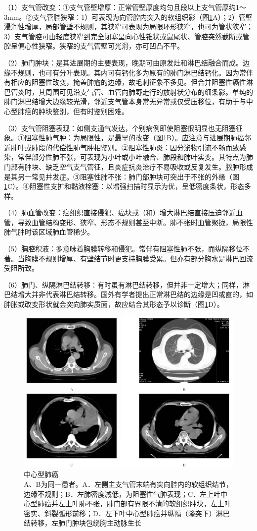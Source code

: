 （1）支气管改变：①支气管壁增厚：正常管壁厚度均匀且段以上支气管厚约1～3mm。②支气管腔狭窄：1）可表现为向管腔内突入的软组织影（图\ref{fig9-28}A）；2）管壁浸润性增厚，局部管壁不规则，其狭窄可表现为局限环形狭窄，也可为管状狭窄；3）支气管腔可由轻度狭窄到完全闭塞呈向心性锥状或鼠尾状、管腔突然截断或管腔呈偏心性狭窄。狭窄的支气管壁可光滑，亦可凹凸不平。

（2）肺门肿块：是其进展期的主要表现，晚期可由原发灶和淋巴结融合而成。边缘不规则，也可有分叶表现。其内可有钙化多为原有的肺门淋巴结钙化。因为常伴有相应的阻塞性改变，掩盖肿瘤的边缘，故毛刺征象不多见。但合并阻塞性癌性淋巴管炎时，其周围可见沿支气管、血管向肺野走行的放射状分布的细条影。单纯的肺门淋巴结增大边缘较光滑，邻近支气管本身常无异常或仅受压移位，有助于与中心型肺癌的肿块鉴别，但有时鉴别困难。

（3）支气管阻塞表现：如侧支通气发达，个别病例即使阻塞很明显也无阻塞征象。①阻塞性肺气肿：为局限性，是最早的改变（图\ref{fig9-28}B）。应注意与进展期肺癌邻近肺叶或肺段的代偿性肺气肿相鉴别。②阻塞性肺炎：因分泌物引流不畅而致感染，常伴部分性肺不张，可表现为小叶或小叶融合、肺段和肺叶实变。其特点为肺门部有肿块、缺乏空气支气管征，且炎症抗炎治疗不易吸收或反复发生。脓肿形成是其另一常见并发症。③阻塞性肺不张：肺门部肿块可突出于不张的外缘（图\ref{fig9-28}C）。④阻塞性支扩和黏液栓塞：以增强扫描时显示为优，呈低密度条状，形态多样。

（4）肺血管改变：癌组织直接侵犯、癌块或（和）增大淋巴结直接压迫邻近血管，导致血管结构变形、狭窄、形态不规则甚至中断。肺不张时血管聚拢，局限性肺气肿时该区域肺血管稀少。

（5）胸腔积液：多意味着胸膜转移和侵犯。常伴有阻塞性肺不张，而纵隔移位不著。当胸膜不规则增厚、有壁结节时更支持胸膜受累。但亦有部分胸水是淋巴回流受阻所致。

（6）肺门、纵隔淋巴结转移：有时虽有淋巴结转移，但并非一定增大；同样，淋巴结增大并非代表淋巴结转移。国外有学者提出正常淋巴结的边缘是凹或直的，如肿胀或改变形状就会突向肺实质面，故应结合其形态予以诊断（图\ref{fig9-28}D）。

\begin{figure}[!htbp]
 \centering
 \includegraphics[width=.7\textwidth,height=\textheight,keepaspectratio]{./images/Image00216.jpg}
 \captionsetup{justification=centering}
 \caption{中心型肺癌\\{\small A、B为同一患者。A．左侧主支气管末端有突向腔内的软组织结节，边缘不规则；B．左肺密度减低，为阻塞性气肿表现；C．左上叶中心型肺癌并左上叶肺不张，肺门部有界限不清的软组织肿块，左上叶密实、斜裂弧形前移；D．左下叶中心型肺癌并纵隔（隆突下）淋巴结转移，左肺门肿块包绕胸主动脉生长}}
 \label{fig9-28}
  \end{figure} 

